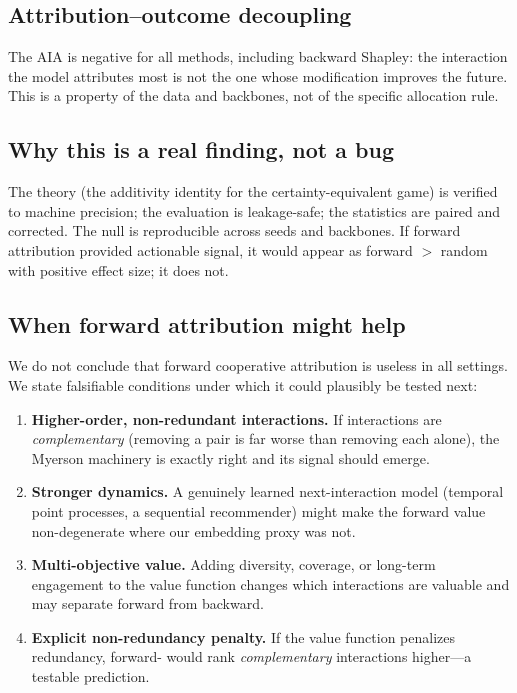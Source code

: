 \documentclass[pdflatex,sn-mathphys-num]{sn-jnl}%
\theoremstyle{thmstyleone}%
\theoremstyle{thmstyletwo}%
\theoremstyle{thmstylethree}%
\newcommand{\CAV}{\mathrm{CAV}}
\begin{document}
\subsection{Attribution--outcome decoupling}
The AIA is negative for all methods, including backward Shapley: the interaction the model attributes most is not the one whose modification improves the future. This is a property of the data and backbones, not of the specific allocation rule.

\subsection{Why this is a real finding, not a bug}
The theory (the additivity identity for the certainty-equivalent game) is verified to machine precision; the evaluation is leakage-safe; the statistics are paired and corrected. The null is reproducible across seeds and backbones. If forward attribution provided actionable signal, it would appear as forward $>$ random with positive effect size; it does not.

\subsection{When forward attribution might help}
We do not conclude that forward cooperative attribution is useless in all settings. We state falsifiable conditions under which it could plausibly be tested next:
\begin{enumerate}
\item \textbf{Higher-order, non-redundant interactions.} If interactions are \emph{complementary} (removing a pair is far worse than removing each alone), the Myerson machinery is exactly right and its signal should emerge.
\item \textbf{Stronger dynamics.} A genuinely learned next-interaction model (temporal point processes, a sequential recommender) might make the forward value non-degenerate where our embedding proxy was not.
\item \textbf{Multi-objective value.} Adding diversity, coverage, or long-term engagement to the value function changes which interactions are valuable and may separate forward from backward.
\item \textbf{Explicit non-redundancy penalty.} If the value function penalizes redundancy, forward-\CAV{} would rank \emph{complementary} interactions higher---a testable prediction.
\end{enumerate}

\end{document}
